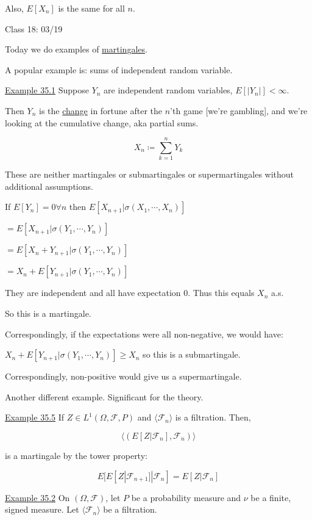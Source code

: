 \documentclass{article}
\theoremstyle{definition}
\begin{document}
Also, \(E[X_n]\) is the same for all \(n\).

\hrulefill

Class 18: 03/19

Today we do examples of \underline{martingales}.

A popular example is: sums of independent random variable.

\underline{Example 35.1} Suppose \(Y_n\) are independent random variables, \(E[\vert Y_n \vert ] < \infty\).

Then \(Y_n\) is the \underline{change} in fortune after the \(n\)'th game [we're gambling], and we're looking at the cumulative change, aka partial sums.

\[
    X_n \coloneqq \sum_{k=1}^{n} Y_k
\]

These are neither martingales or submartingales or supermartingales without additional assumptions.

If \(E[Y_n] = 0 \forall n\) then \(E[X_{n + 1}| \sigma(X_1,\cdots,X_n)]\)

\(=E[X_{n+1}|\sigma(Y_1,\cdots,Y_n)]\)

\(=E[X_n + Y_{n+1}|\sigma(Y_1,\cdots, Y_n)]\)

\(= X_n + E[Y_{n+1}|\sigma(Y_1,\cdots, Y_n)]\)

They are independent and all have expectation \(0\). Thus this equals \(X_n\) a.s.

So this is a martingale.

Correspondingly, if the expectations were all non-negative, we would have:

\(X_n + E[Y_{n+1}|\sigma(Y_1,\cdots,Y_n)]\geq X_n\) so this is a submartingale.

Correspondingly, non-positive would give us a supermartingale.

Another different example. Significant for the theory.

\underline{Example 35.5} If \(Z\in L^1(\Omega , \mathscr{F} , P)\) and \(\langle \mathscr{F}_n \rangle \) is a filtration. Then,

\[
    \langle (E[Z|\mathscr{F}_n],\mathscr{F}_n) \rangle 
\]

is a martingale by the tower property:

\[
    E[E[Z|\mathscr{F}_{n+1}]|\mathscr{F}_n] = E[Z|\mathscr{F}_n]
\]

\underline{Example 35.2} On \((\Omega, \mathscr{F})\), let \(P\) be a probability measure and \(\nu\) be a finite, signed measure. Let \(\langle \mathscr{F}_n \rangle \)  be a filtration.
\end{document}
